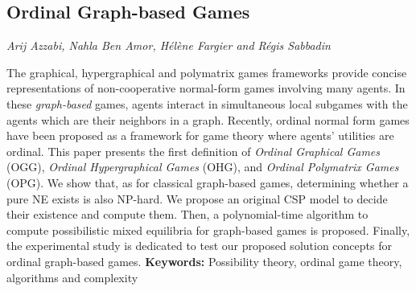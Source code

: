 \documentclass[../booklet.tex]{subfiles}
\begin{document}
\subsection[Ordinal Graph-based Games. {\it Arij Azzabi, Nahla Ben Amor, Hélène Fargier and Régis Sabbadin}]{Ordinal Graph-based Games}
   

\begin{center}
  {\it Arij Azzabi, Nahla Ben Amor, Hélène Fargier and Régis Sabbadin}
\end{center}

\vskip 0.8cm

 
 The graphical, hypergraphical and polymatrix games frameworks provide concise representations of non-cooperative normal-form games involving many agents. In these {\em graph-based} games, agents interact in simultaneous local subgames with the agents which are their neighbors in a graph. 
Recently, ordinal normal form games have been proposed as a framework for game theory where agents' utilities are ordinal. 
This paper presents the first definition of \emph{Ordinal Graphical Games} (OGG),  \emph{Ordinal Hypergraphical Games} (OHG), and \emph{Ordinal Polymatrix Games} (OPG). 
We show that, as for classical graph-based games, determining whether a pure NE exists is also NP-hard. We propose an original CSP model to decide their existence and compute them.
Then, a polynomial-time algorithm to compute possibilistic mixed equilibria for graph-based games is proposed. Finally, the experimental study is dedicated to test our proposed solution concepts for ordinal graph-based games.
{\bf Keywords:} Possibility theory, ordinal game theory, algorithms and complexity 
\end{document}
